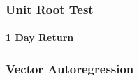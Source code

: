 \subsubsection{Unit Root Test}

\paragraph{1 Day Return}

\paragraph{}

\subsubsection{Vector Autoregression}
